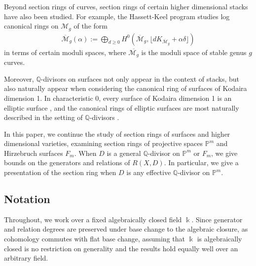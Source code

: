 \documentclass{amsart}
\theoremstyle{plain}
\theoremstyle{definition}
\theoremstyle{remark}
\numberwithin{equation}{section}
\newcommand\bq{{\mathbb Q}}
\newcommand\bp{{\mathbb P}}
\newcommand\bk{{\Bbbk}}
\newcommand\hirz{F}
\begin{document}
Beyond section rings of curves, section rings of certain higher dimensional
stacks have also been studied.
For example, the Hassett-Keel program \cite{hassett:classical-and-minimal-models}
studies log canonical rings on ${\mathscr M}_g$ of the form 
\begin{align*}
	\overline {\mathscr M}_g(\alpha) := \bigoplus_{d \geq 0} H^0 \left(
	\overline {\mathscr M}_g, \lfloor d K_{\overline{\mathscr M}_g} +
	\alpha\delta \rfloor  \right) 
\end{align*}
in terms of certain moduli spaces, where $\overline {\mathscr M_g}$ is the
moduli space of stable genus $g$ curves.

Moreover, $\bq$-divisors on surfaces not only appear in the context of stacks,
but also naturally
appear when considering the canonical ring of surfaces of Kodaira dimension 1.
In characteristic 0, every surface of Kodaira dimension 1 is an elliptic surface \cite[p. 244]{
barthHPV:compactComplexSurfaces}, and
the canonical rings of elliptic surfaces are most naturally described in the setting of
$\bq$-divisors \cite[Chapter V, Theorem 12.1]{barthHPV:compactComplexSurfaces}. 

In this paper, we continue the study of section rings of
surfaces and higher dimensional varieties, examining section rings of
projective spaces $\bp^m$ and Hirzebruch surfaces $\hirz_m$.
When $D$ is a general $\bq$-divisor on $\bp^m$ or
$\hirz_m$, we give bounds on the generators and relations of
$R(X, D)$. In particular, we give a presentation of the
section ring when $D$ is any effective
$\bq$-divisor on $\bp^m$.  

\subsection{Notation}
Throughout, we work over a fixed algebraically closed field $\bk$.
Since generator and relation degrees are preserved under base change to the algebraic closure, 
as cohomology commutes with flat base change,
assuming that $\bk$ is algebraically closed is no restriction
on generality and the results hold equally well over an arbitrary field.
\end{document}
